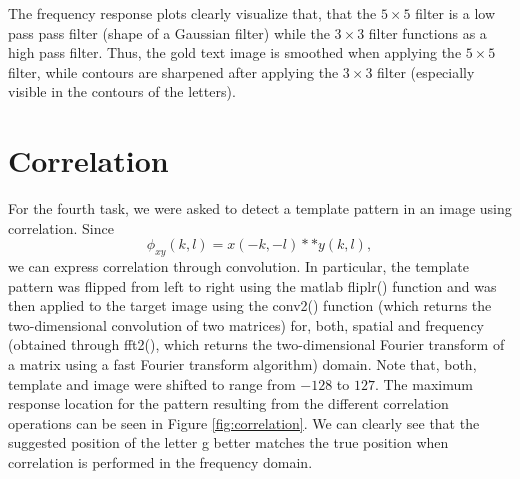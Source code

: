 \documentclass{article}
\begin{document}
The frequency response plots clearly visualize that, that the $5\times5$ filter is a low pass pass filter (shape of a Gaussian filter) while the $3 \times 3$ filter functions as a high pass filter. Thus, the gold text image is smoothed when applying the $5 \times 5$ filter, while contours are sharpened after applying the $3 \times 3$ filter (especially visible in the contours of the letters).

\section{Correlation}
For the fourth task, we were asked to detect a template pattern in an image using correlation. Since
\begin{equation*}
    \phi_{xy}(k, l) = x(-k, -l)**y(k, l),
\end{equation*}
we can express correlation through convolution. In particular, the template pattern was flipped from left to right using the matlab fliplr() function and was then applied to the target image using the conv2() function (which returns the two-dimensional convolution of two matrices) for, both, spatial and frequency (obtained through fft2(), which returns the two-dimensional Fourier transform of a matrix using a fast Fourier transform algorithm) domain. Note that, both, template and image were shifted to range from $-128$ to $127$. The maximum response location for the pattern resulting from the different correlation operations can be seen in Figure \ref{fig:correlation}. We can clearly see that the suggested position of the letter g better matches the true position when correlation is performed in the frequency domain.
\end{document}
